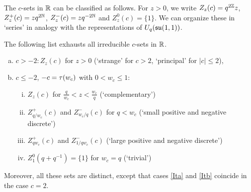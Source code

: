 The $c$-sets in $\mathbb{R}$ can be classified as follows. For $z>0$, we write $Z_z(c) = q^{2\mathbb{Z}}z$, $Z_z^+(c) = zq^{2\mathbb{N}}$, $Z_{z}^{-}(c) = zq^{-2\mathbb{N}}$ and $Z_z^{0}(c) = \{1\}$.  We can organize these in `series' in analogy with the representations of $U_q(\mathfrak{su}(1,1))$.

\begin{Prop}\label{PropClass1D} The following list exhausts all
  irreducible $c$-sets in $\mathbb{R}$.
\begin{enumerate}[a)] 
\item $c>-2: Z_z(c)$ for $z>0$ (`strange' for $c>2$, `principal' for $|c|\leq 2$),
\item $c \leq -2$, $-c=\operatorname{\tau}(w_c)$ with $0 < w_c\leq 1$:
\begin{enumerate}[(i)]
\item $Z_z(c)$ for $\frac{q}{w_c}<z<\frac{w_c}{q}$ (`complementary')
\item\label{Ita} $Z_{q/w_c}^+(c)$ and $Z_{w_c/q}^-(c)$ for $q<w_c$ (`small positive and negative discrete')
\item\label{Itb} $Z_{qw_c}^+(c)$ and $Z_{1/qw_c}^-(c)$ (`large positive and negative discrete')
\item $Z_1^0(q+q^{-1})=\{1\}$ for $w_c=q$ (`trivial')
\end{enumerate}
\end{enumerate}
Moreover, all these sets are distinct, except that cases \eqref{Ita} and \eqref{Itb} coincide in the case $c=2$.
\end{Prop} 

